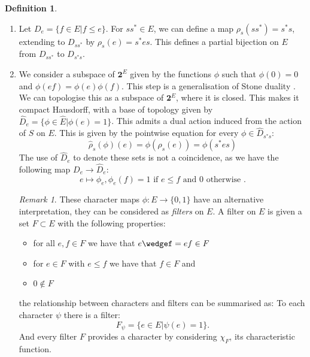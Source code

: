 \documentclass[11pt]{amsart}
\theoremstyle{plain}
\theoremstyle{definition}%
\newtheorem{definition}[theorem]{Definition}%
\theoremstyle{remark}%
\newtheorem{remark}[theorem]{Remark}%
\newcommand{\E}{\widehat{E}}
\begin{document}
\begin{definition}

\begin{enumerate}
\item Let $D_{e}=\lbrace f \in E | f \leq e \rbrace$. For $ss^{*} \in E$, we can define a map $\rho_{s}(ss^{*})=s^{*}s$, extending to $D_{ss^{*}}$ by $\rho_{s}(e) = s^{*}es$. This defines a partial bijection on $E$ from $D_{ss^{*}}$ to $D_{s^{*}s}$. 

\item We consider a subspace of $\textbf{2}^{E}$ given by the functions $\phi$ such that $\phi(0)=0$ and $\phi(ef)=\phi(e)\phi(f)$. This step is a generalisation of Stone duality \cite{Lawson-2010}. We can topologise this as a subspace of $\textbf{2}^{E}$, where it is closed. This makes it compact Hausdorff, with a base of topology given by $\widehat{D}_{e}= \lbrace \phi \in \E | \phi(e)=1 \rbrace$. This admits a dual action induced from the action of $S$ on $E$. This is given by the pointwise equation for every $\phi \in \widehat{D}_{s^{*}s}$:
\begin{equation*}
\widehat{\rho}_{s}(\phi)(e)=\phi(\rho_{s}(e))=\phi(s^{*}es)
\end{equation*}
The use of $\widehat{D}_{e}$ to denote these sets is not a coincidence, as we have the following map $D_{e} \rightarrow \widehat{D}_{e}$:
\begin{equation*}
e \mapsto \phi_{e}, \phi_{e}(f)=1 \mbox{ if } e \leq f \mbox{ and } 0 \mbox{ otherwise }.
\end{equation*}
\begin{remark}
These character maps $\phi: E \rightarrow \lbrace 0,1 \rbrace$ have an alternative interpretation, they can be considered as \textit{filters} on $E$. A filter on $E$ is given  a set $F \subset E$ with the following properties:
\begin{itemize}
\item for all $e,f \in F$ we have that $e\wedgef=ef \in F$
\item for $e\in F$ with $e \leq f$ we have that $f \in F$ and
\item $0 \not\in F$
\end{itemize}
the relationship between characters and filters can be summarised as: To each character $\psi$ there is a filter:
\begin{equation*}
F_{\psi}= \lbrace e \in E | \psi(e)=1 \rbrace.
\end{equation*}
And every filter $F$ provides a character by considering $\chi_{F}$, its characteristic function.
\end{remark}


\end{enumerate}
\end{definition}
\end{document}
